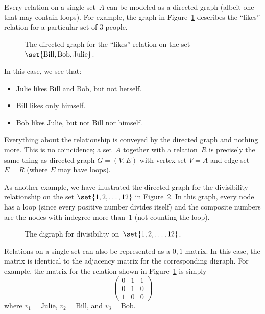 Every relation on a single set~$A$ can be modeled as a directed graph
(albeit one that may contain loops).  For example, the graph in
Figure~\ref{fig:7FE} describes the ``likes'' relation for a particular
set of 3 people.

\begin{figure}


\caption{The directed graph for the ``likes'' relation on the set
  $\set{ \text{Bill}, \text{Bob}, \text{Julie} }$.}

\label{fig:7FE}

\end{figure}

In this case, we see that:
\begin{itemize}

\item
Julie likes Bill and Bob, but not herself.

\item
Bill likes only himself.

\item
Bob likes Julie, but not Bill nor himself.

\end{itemize}
Everything about the relationship is conveyed by the directed graph
and nothing more.  This is no coincidence; a set~$A$ together with a
relation~$R$ is precisely the same thing as directed graph $G = (V,
E)$ with vertex set $V = A$ and edge set $E = R$ (where $E$ may have
loops).

As another example, we have illustrated the directed graph for the
divisibility relationship on the set $\set{1, 2, \dots, 12}$ in
Figure~\ref{fig:7FF}.  In this graph, every node has a loop (since
every positive number divides itself) and the composite numbers are
the nodes with indegree more than~1 (not counting the
loop).

\begin{figure}


\caption{The digraph for divisibility on~$\set{1, 2, \dots, 12}$.}

\label{fig:7FF}

\end{figure}

Relations on a single set can also be represented as a $0, 1$-matrix.
In this case, the matrix is identical to the adjacency matrix for the
corresponding digraph.  For example, the matrix for the relation shown
in Figure~\ref{fig:7FE} is simply
\begin{equation*}
    \begin{pmatrix}
        0 & 1 & 1 \\
        0 & 1 & 0 \\
        1 & 0 & 0
    \end{pmatrix}
\end{equation*}
where $v_1 = \text{Julie}$, $v_2 = \text{Bill}$, and $v_3 =
\text{Bob}$.

